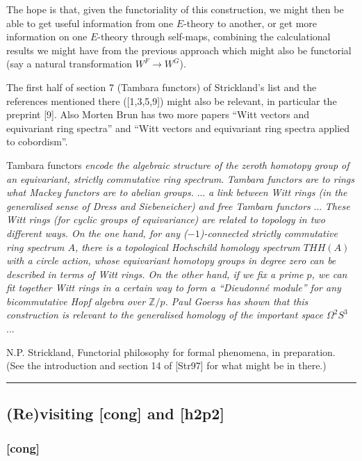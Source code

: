 \documentclass{rs}
\theoremstyle{definition}
\theoremstyle{remark}
\newcommand{\mb}[1]{\mathbb{#1}}
\renewcommand{\=}{\approx}
\renewcommand{\-}{\sim}
\numberwithin{equation}{section}
\numberwithin{thm}{section}
\begin{document}
The hope is that, given the functoriality of this construction, we might then be able to get useful information from one $E$-theory to another, 
or get more information on one $E$-theory through self-maps, combining the calculational results we might have from the previous approach 
which might also be functorial (say a natural transformation $W^F \to W^G$).

The first half of section 7 (Tambara functors) of Strickland's list and the references mentioned there ([1,3,5,9]) might also be relevant, in particular the preprint [9]. 
Also Morten Brun has two more papers ``Witt vectors and equivariant ring spectra'' and ``Witt vectors and equivariant ring spectra applied to cobordism''.

Tambara functors {\em encode the algebraic structure of the zeroth homotopy group of an equivariant, strictly commutative ring spectrum}. 
{\em Tambara functors are to rings what Mackey functors are to abelian groups.} 
... {\em a link between Witt rings (in the generalised sense of Dress and Siebeneicher) and free Tambara functors} ... 
{\em These Witt rings (for cyclic groups of equivariance) are related to topology in two different ways. 
On the one hand, for any ($-1$)-connected strictly commutative ring spectrum $A$, there is a topological Hochschild homology spectrum $THH(A)$ with a circle action, 
whose equivariant homotopy groups in degree zero can be described in terms of Witt rings. 
On the other hand, if we fix a prime $p$, we can fit together Witt rings in a certain way to form a ``Dieudonn\'e module'' for any bicommutative Hopf algebra over $\mb Z/p$. 
Paul Goerss has shown that this construction is relevant to the generalised homology of the important space $\Omega^2 S^3$} ...

N.P. Strickland, Functorial philosophy for formal phenomena, in preparation. (See the introduction and section 14 of [Str97] for what might be in there.)
\\

\hrule

\subsection{(Re)visiting [cong] and [h2p2]}

\subsubsection{[cong]}
\end{document}
